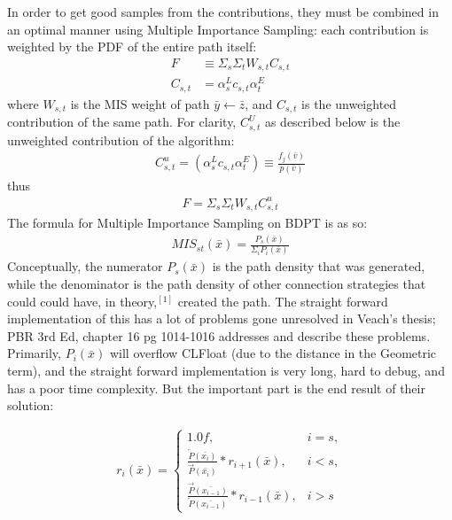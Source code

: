 \documentclass{article}
\begin{document}
  In order to get good
  samples from the contributions, they must be combined in an optimal manner
  using Multiple Importance Sampling: each contribution is weighted by the PDF
  of the entire path itself:
  \begin{align*}
    F &\equiv \Sigma_s\Sigma_tW_{s, t}C_{s, t}\\
    C_{s, t} &= \alpha^L_s c_{s, t} \alpha^E_t
  \end{align*}
    where $W_{s, t}$ is the MIS weight of path $\bar{y} \leftarrow \bar{z}$, and
    $C_{s, t}$ is the unweighted contribution of the same path. For clarity,
    $C^U_{s, t}$ as described below is the unweighted contribution of the
    algorithm:
  \begin{align}
    C^u_{s, t} = (\alpha^L_s c_{s, t} \alpha^E_t) \equiv
    \frac{f_j(\bar{v})}{p(\bar{v})}
  \end{align}
  thus
  \begin{align}
    F = \Sigma_s\Sigma_tW_{s, t}C^u_{s, t}
  \end{align}
    The formula for Multiple Importance Sampling on BDPT is as so:
  \begin{align}
    MIS_{st}(\bar{x}) = \frac{P_s(\bar{x})}{\Sigma_i{P_i(\bar{x})}} 
  \end{align}
    Conceptually, the numerator $P_s(\bar{x})$ is the path density that was
    generated, while the denominator is the path density of other connection
    strategies that could could have, in theory,$^{[1]}$ created the path. The
    straight forward implementation of this has a lot of problems gone
    unresolved in Veach's thesis; PBR 3rd Ed, chapter 16 pg 1014-1016 addresses
    and describe these problems. Primarily, $P_i(\bar{x})$ will overflow
    CLFloat (due to the distance in the Geometric term), and the straight
    forward implementation is very long, hard to debug, and has a poor time
    complexity. But the important part is the end result of their solution:

  \begin{align}
    r_i (\bar{x}) = 
    \begin{cases}
      1.0f, & i = s,\\
      \frac{\overleftarrow{P}(\bar{x_i})}{\overrightarrow{P}(\bar{x_i})} *
      r_{i+1}(\bar{x}), & i < s,\\
      \frac{\overrightarrow{P}(\bar{x_{i-1}})}{\overleftarrow{P}(\bar{x_{i-1}})}
      * r_{i-1}(\bar{x}), & i > s
    \end{cases}
  \end{align}
\end{document}
